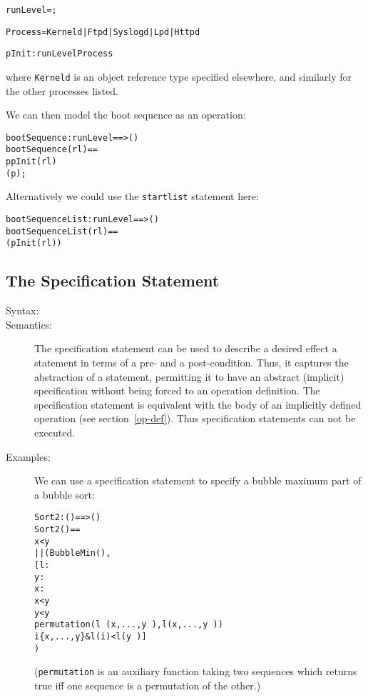 \documentclass[\pformat,12pt]{article}
\begin{document}
\begin{description}
\begin{alltt}
    runLevel = ;

    Process = Kerneld | Ftpd | Syslogd | Lpd | Httpd

    pInit :  runLevel  Process
\end{alltt}
where \texttt{Kerneld} is an object reference type specified
elsewhere, and similarly for the other processes listed. 

We can then model the boot sequence as an operation:
\begin{alltt}
    bootSequence : runLevel ==> ()
    bootSequence(rl) ==
       p  pInit(rl) 
        (p);
\end{alltt}
Alternatively we could use the \texttt{startlist} statement here:
\begin{alltt}
    bootSequenceList : runLevel ==> ()
    bootSequenceList(rl) ==
      (pInit(rl))
\end{alltt}
\end{description}

\subsection{The Specification Statement} \label{se:specification}

\begin{description}
\item[Syntax:] 

\item[Semantics:] 

The specification statement can be used to describe a desired effect a
statement in terms of a pre- and a post-condition. Thus, it captures
the abstraction of a statement, permitting it to have an abstract
(implicit) specification without being forced to an operation
definition. The specification statement is equivalent with the body of
an implicitly defined operation (see section~\ref{op-def}). Thus
specification statements can not be executed.

\item[Examples:] We can use a specification statement to specify a
  bubble maximum part of a bubble sort:
  \begin{alltt}
  Sort2 : () ==> ()
  Sort2 () ==
     x < y 
      || (BubbleMin(),
          [ l : 
               y : 
               x : 
            x < y
            y < y~ 
                permutation (l~(x,...,y~),l(x,...,y~)) 
                 i  \{x,...,y\} & l(i) < l(y~)]
         )
  \end{alltt}
  (\texttt{permutation} is an auxiliary function taking two sequences
  which returns true iff one sequence is a permutation of the other.)


\end{description}
\end{document}

